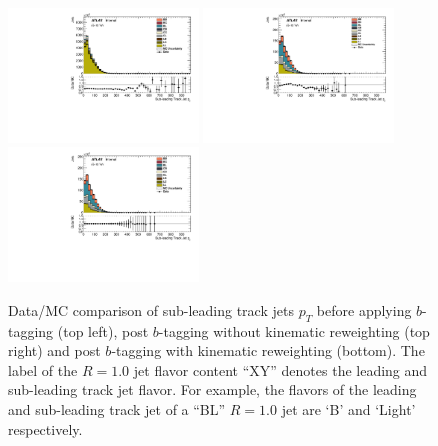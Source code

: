 \begin{figure}[htbp]
  \centering
\includegraphics[width=0.45\textwidth]{figures/gbb/SubLeadTrkJet_pT_NoReweight.pdf}
\includegraphics[width=0.45\textwidth]{figures/gbb/SubLeadTrkJet_pT_PreReweight.pdf}\\
 \includegraphics[width=0.45\textwidth]{figures/gbb/SubLeadTrkJet_pT_Reweight.pdf}
\caption{Data/MC comparison of sub-leading track jets $p_T$ before applying $b$-tagging (top left), post $b$-tagging without kinematic reweighting (top right) and post $b$-tagging with kinematic reweighting (bottom). The label of the $R=1.0$ jet flavor content ``XY'' denotes the leading and sub-leading track jet flavor. For example, the flavors of the leading and sub-leading track jet of a ``BL'' $R=1.0$ jet are `B' and `Light' respectively.}
  \label{fig:gbb-pT_subtrkjets}
\end{figure}


